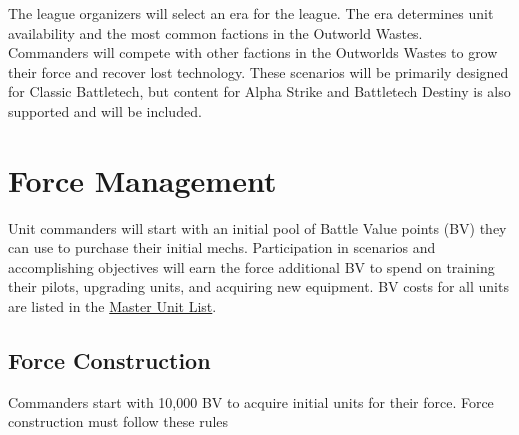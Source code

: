 \documentclass[UTF8]{article}
\begin{document}
The league organizers will select an era for the league.
The era determines unit availability and the most common factions in the Outworld Wastes.\\ 

Commanders will compete with other factions in the Outworlds Wastes to grow their force and recover lost technology.
These scenarios will be primarily designed for Classic Battletech, but content for Alpha Strike and Battletech Destiny is also supported and will be included.\\

\newpage

\section{Force Management}

Unit commanders will start with an initial pool of Battle Value points (BV) they can use to purchase their initial mechs.
Participation in scenarios and accomplishing objectives will earn the force additional BV to spend on training their pilots, upgrading units, and acquiring new equipment.
BV costs for all units are listed in the \href{http://www.masterunitlist.info/}{Master Unit List}.\\

\subsection{Force Construction}

Commanders start with 10,000 BV to acquire initial units for their force.
Force construction must follow these rules
\end{document}
